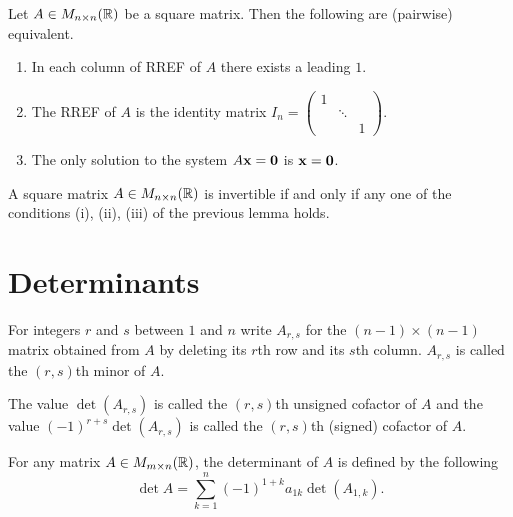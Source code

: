 \documentclass[10pt, a4paper]{article}
\begin{document}
\begin{lemma}
    Let $A \in M_{n \times n}(\mathbb{R})$ be a square matrix.
    Then the following are (pairwise) equivalent.
    \begin{enumerate}[label = (\roman*)]
        \item In each column of RREF of $A$ there exists a leading $1$.
        \item The RREF of $A$ is the identity matrix $I_n = \begin{pmatrix}
            1 & \phantom{} & \phantom{} \\
            \phantom{} & \ddots & \phantom{} \\
            \phantom{} & \phantom{} & 1
        \end{pmatrix}$.
        \item The only solution to the system $A\mathbf{x} = \mathbf{0}$ is $\mathbf{x} = \mathbf{0}$.
    \end{enumerate}
\end{lemma}

\begin{theorem}
    A square matrix $A \in M_{n \times n}(\mathbb{R})$ is invertible if and only if any one of the conditions (i), (ii), (iii) of the previous lemma holds.
\end{theorem}

\newpage

\section{Determinants}

\begin{remark}
    For integers $r$ and $s$ between $1$ and $n$ write $A_{r, s}$ for the $(n - 1) \times (n - 1)$ matrix obtained from $A$ by deleting its $r$th row and its $s$th column.
    $A_{r, s}$ is called the $(r, s)$th minor of $A$.
\end{remark}

\begin{remark}
    The value $\det(A_{r, s})$ is called the $(r, s)$th unsigned cofactor of $A$ and the value $(-1) ^ {r + s}\det(A_{r, s})$ is called the $(r, s)$th (signed) cofactor of $A$.
\end{remark}

\begin{definition}
    For any matrix $A \in M_{m \times n}(\mathbb{R})$,
    the determinant of $A$ is defined by the following
    \[
    \det{A} = \sum_{k = 1}^{n}(-1) ^ {1 + k}a_{1k}\det(A_{1, k}).
    \]
\end{definition}
\end{document}

